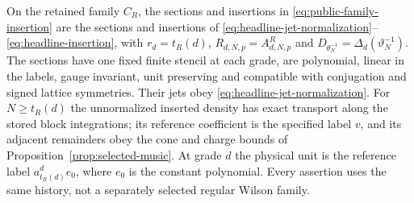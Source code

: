 \begin{proposition}
\label{prop:public-normalized-observables}
On the retained family $C_R$, the sections and insertions in
\eqref{eq:public-family-insertion} are the sections and insertions of
\eqref{eq:headline-jet-normalization}--\eqref{eq:headline-insertion}, with
$r_d=t_R(d)$, $R_{d,N,p}=A^R_{d,N,p}$ and
$D_{\theta_N^{-1}}=\Delta_d(\vartheta_N^{-1})$.
The sections have one fixed finite stencil at each grade, are polynomial,
linear in the labels, gauge invariant, unit preserving and compatible
with conjugation and signed lattice symmetries. Their jets obey
\eqref{eq:headline-jet-normalization}.
For $N\ge t_R(d)$ the unnormalized inserted density has exact transport
along the stored block integrations; its reference coefficient is the
specified label $v$, and its adjacent remainders obey the cone and
charge bounds of Proposition~\ref{prop:selected-music}.
At grade $d$ the physical unit is the reference label
$a_{t_R(d)}^d e_0$, where $e_0$ is the constant polynomial.
Every assertion uses the same history, not a separately selected
regular Wilson family.
\end{proposition}
